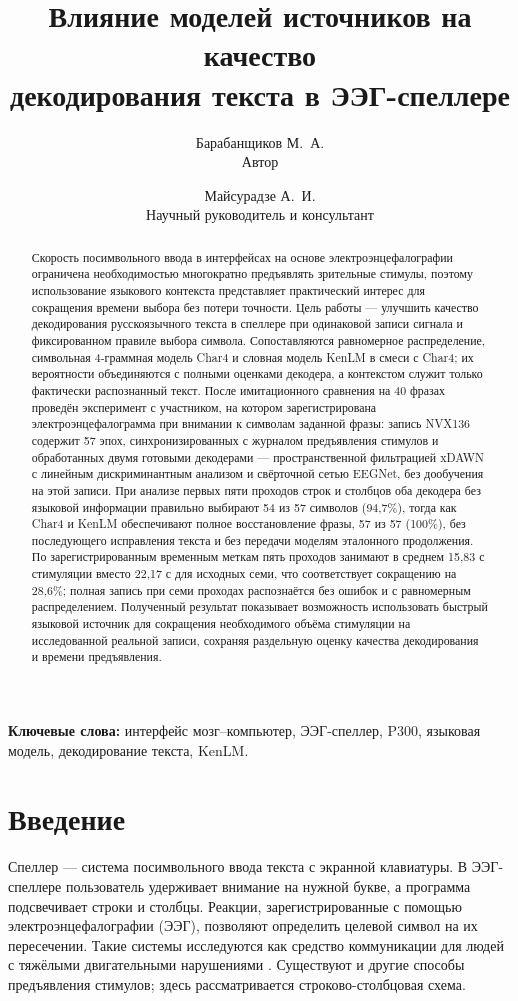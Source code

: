 \documentclass[11pt,a4paper]{article}
\title{Влияние моделей источников на качество\\декодирования текста в ЭЭГ-спеллере}
\author{Барабанщиков М.~А.\\Автор\and Майсурадзе А.~И.\\Научный руководитель и консультант}
\date{}
\begin{document}
\maketitle
\vspace{-.5em}
\begin{abstract}
Скорость посимвольного ввода в интерфейсах на основе электроэнцефалографии ограничена необходимостью многократно предъявлять зрительные стимулы, поэтому использование языкового контекста представляет практический интерес для сокращения времени выбора без потери точности. Цель работы --- улучшить качество декодирования русскоязычного текста в спеллере при одинаковой записи сигнала и фиксированном правиле выбора символа. Сопоставляются равномерное распределение, символьная 4-граммная модель Char4 и словная модель KenLM в смеси с Char4; их вероятности объединяются с полными оценками декодера, а контекстом служит только фактически распознанный текст. После имитационного сравнения на 40 фразах проведён эксперимент с участником, на котором зарегистрирована электроэнцефалограмма при внимании к символам заданной фразы: запись NVX136 содержит 57 эпох, синхронизированных с журналом предъявления стимулов и обработанных двумя готовыми декодерами --- пространственной фильтрацией xDAWN с линейным дискриминантным анализом и свёрточной сетью EEGNet, без дообучения на этой записи. При анализе первых пяти проходов строк и столбцов оба декодера без языковой информации правильно выбирают 54 из 57 символов (94,7\%), тогда как Char4 и KenLM обеспечивают полное восстановление фразы, 57 из 57 (100\%), без последующего исправления текста и без передачи моделям эталонного продолжения. По зарегистрированным временным меткам пять проходов занимают в среднем 15,83 с стимуляции вместо 22,17 с для исходных семи, что соответствует сокращению на 28,6\%; полная запись при семи проходах распознаётся без ошибок и с равномерным распределением. Полученный результат показывает возможность использовать быстрый языковой источник для сокращения необходимого объёма стимуляции на исследованной реальной записи, сохраняя раздельную оценку качества декодирования и времени предъявления.
\end{abstract}
\noindent\textbf{Ключевые слова:} интерфейс мозг--компьютер, ЭЭГ-спеллер, P300, языковая модель, декодирование текста, KenLM.


\section{Введение}
Спеллер --- система посимвольного ввода текста с экранной клавиатуры. В ЭЭГ-спеллере пользователь удерживает внимание на нужной букве, а программа подсвечивает строки и столбцы. Реакции, зарегистрированные с помощью электроэнцефалографии (ЭЭГ), позволяют определить целевой символ на их пересечении. Такие системы исследуются как средство коммуникации для людей с тяжёлыми двигательными нарушениями \citep{p29601538,p29051907}.
Существуют и другие способы предъявления стимулов; здесь рассматривается строково-столбцовая схема.
\end{document}
